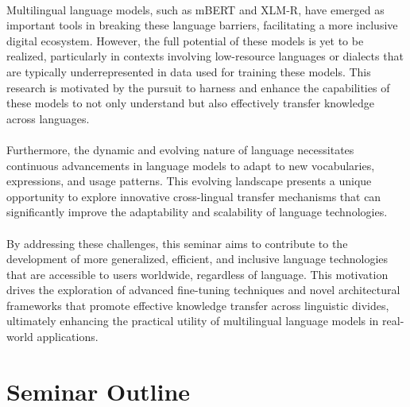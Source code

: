 \paragraph{} Multilingual language models, such as mBERT and XLM-R, have emerged as important tools in breaking these language barriers, facilitating a more inclusive digital ecosystem. However, the full potential of these models is yet to be realized, particularly in contexts involving low-resource languages or dialects that are typically underrepresented in data used for training these models. This research is motivated by the pursuit to harness and enhance the capabilities of these models to not only understand but also effectively transfer knowledge across languages.

\paragraph{} Furthermore, the dynamic and evolving nature of language necessitates continuous advancements in language models to adapt to new vocabularies, expressions, and usage patterns. This evolving landscape presents a unique opportunity to explore innovative cross-lingual transfer mechanisms that can significantly improve the adaptability and scalability of language technologies.

\paragraph{} By addressing these challenges, this seminar aims to contribute to the development of more generalized, efficient, and inclusive language technologies that are accessible to users worldwide, regardless of language. This motivation drives the exploration of advanced fine-tuning techniques and novel architectural frameworks that promote effective knowledge transfer across linguistic divides, ultimately enhancing the practical utility of multilingual language models in real-world applications.

\section{Seminar Outline}\label{sec: Seminar Outline}
